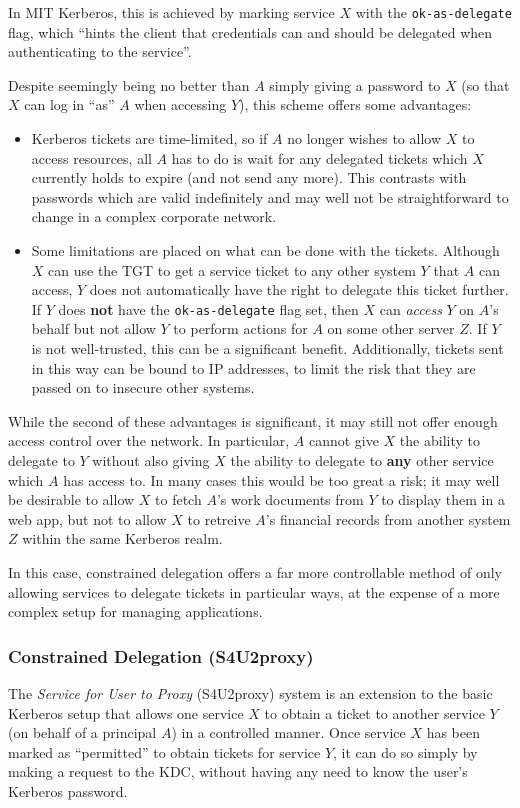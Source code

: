 \documentclass{article}
\begin{document}
In MIT Kerberos, this is achieved by marking service $X$ with the \verb+ok-as-delegate+ flag, which ``hints the client that credentials can and should be delegated when authenticating to the service''\cite{KDC-conf-docs}.

Despite seemingly being no better than $A$ simply giving a password to $X$ (so that $X$ can log in ``as'' $A$ when accessing $Y$), this scheme offers some advantages:

\begin{itemize}
\item
  Kerberos tickets are time-limited, so if $A$ no longer wishes to allow $X$ to access resources, all $A$ has to do is wait for any delegated tickets which $X$ currently holds to expire (and not send any more). This contrasts with passwords which are valid indefinitely and may well not be straightforward to change in a complex corporate network.
\item
  Some limitations are placed on what can be done with the tickets. Although $X$ can use the TGT to get a service ticket to any other system $Y$ that $A$ can access, $Y$ does not automatically have the right to delegate this ticket further. If $Y$ does \textbf{not} have the \verb+ok-as-delegate+ flag set, then $X$ can \textit{access} $Y$ on $A$'s behalf but not allow $Y$ to perform actions for $A$ on some other server $Z$. If $Y$ is not well-trusted, this can be a significant benefit. Additionally, tickets sent in this way can be bound to IP addresses, to limit the risk that they are passed on to insecure other systems.
\end{itemize}

While the second of these advantages is significant, it may still not offer enough access control over the network. In particular, $A$ cannot give $X$ the ability to delegate to $Y$ without also giving $X$ the ability to delegate to \textbf{any} other service which $A$ has access to. In many cases this would be too great a risk; it may well be desirable to allow $X$ to fetch $A$'s work documents from $Y$ to display them in a web app, but not to allow $X$ to retreive $A$'s financial records from another system $Z$ within the same Kerberos realm.

In this case, constrained delegation offers a far more controllable method of only allowing services to delegate tickets in particular ways, at the expense of a more complex setup for managing applications.

\subsubsection{Constrained Delegation (S4U2proxy)}
The \textit{Service for User to Proxy} (S4U2proxy) system is an extension to the basic Kerberos setup that allows one service $X$ to obtain a ticket to another service $Y$ (on behalf of a principal $A$) in a controlled manner. Once service $X$ has been marked as ``permitted'' to obtain tickets for service $Y$, it can do so simply by making a request to the KDC, without having any need to know the user's Kerberos password\cite{MS-s4u2}.
\end{document}
